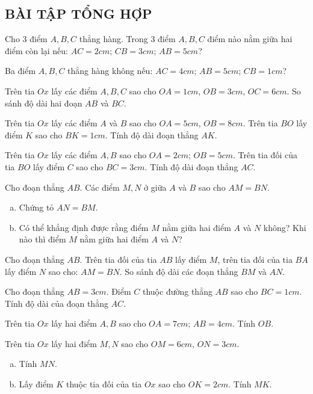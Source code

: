\begin{bt}
\subsection{BÀI TẬP TỔNG HỢP}
\end{bt}   \begin{bt}
Cho $3$ điểm $A, B, C$ thẳng hàng. Trong $3$ điểm $A, B, C$ điểm nào nằm giữa hai điểm còn lại nếu: $AC = 2cm$; $CB = 3cm$; $AB = 5cm$?
\end{bt}   \begin{bt}
Ba điểm $A, B, C$ thẳng hàng không nếu: $AC = 4cm$; $AB =5cm$; $CB = 1cm$?
\end{bt}   \begin{bt}
Trên tia $Ox$ lấy các điểm $A, B, C$ sao cho $OA = 1cm$, $OB = 3cm$, $OC = 6cm$. So sánh độ dài hai đoạn $AB$ và $BC$.
\end{bt}   \begin{bt}
Trên tia $Ox$ lấy các điểm $A$ và $B$ sao cho $OA = 5cm$, $OB = 8cm$. Trên tia $BO$ lấy điểm $K$ sao cho $BK = 1cm$. Tính độ dài đoạn thẳng $AK$.
\end{bt}   \begin{bt}
Trên tia $Ox$ lấy các điểm $A, B$ sao cho $OA = 2cm$; $OB = 5cm$. Trên tia đối của tia $BO$ lấy điểm $C$ sao cho $BC = 3cm$. Tính độ dài đoạn thẳng $AC$.
\end{bt}   \begin{bt}
Cho đoạn thẳng $AB$. Các điểm $M, N$ ở giữa $A$ và $B$ sao cho $AM = BN$.
\begin{enumerate}[a)]
\item 	Chứng tỏ $AN = BM$.
\item	Có thể khẳng định được rằng điểm $M$ nằm giữa hai điểm $A$ và $N$ không? Khi nào thì điểm $M$ nằm giữa hai điểm $A$ và $N$?
\end{enumerate}
\end{bt}   \begin{bt}
Cho đoạn thẳng $AB$. Trên tia đối của tia $AB$ lấy điểm $M$, trên tia đối của tia $BA$ lấy điểm $N$ sao cho: $AM = BN$. So sánh độ dài các đoạn thẳng $BM$ và $AN$.
\end{bt}   \begin{bt}
Cho đoạn thẳng $AB = 3cm$. Điểm $C$ thuộc đường thẳng $AB$ sao cho $BC = 1cm$. Tính độ dài của đoạn thẳng $AC$.
\end{bt}   \begin{bt}
Trên tia $Ox$ lấy hai điểm $A, B$ sao cho $OA = 7cm$; $AB = 4cm$. Tính $OB$.
\end{bt}   \begin{bt}
Trên tia $Ox$ lấy hai điểm $M, N$ sao cho $OM = 6cm$, $ON = 3cm$.
\begin{enumerate}[a)]
\item	Tính $MN$.
\item	Lấy điểm $K$ thuộc tia đối của tia $Ox$ sao cho $OK = 2cm$. Tính $MK$.
\end{enumerate}

\end{bt}